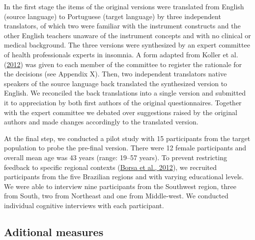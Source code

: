 \documentclass[
  ,doc,11pt, twoside,floatsintext]{apa6}
\begin{document}
In the first stage the items of the original versions were translated from English (source language) to Portuguese (target language) by three independent translators, of which two were familiar with the instrument constructs and the other English teachers unaware of the instrument concepts and with no clinical or medical background. The three versions were synthesized by an expert committee of health professionals experts in insomnia. A form adapted from Koller et al. (\protect\hyperlink{ref-koller2012}{2012}) was given to each member of the committee to register the rationale for the decisions (see Appendix X). Then, two independent translators native speakers of the source language back translated the synthesized version to English. We reconciled the back translations into a single version and submitted it to appreciation by both first authors of the original questionnaires. Together with the expert committee we debated over suggestions raised by the original authors and made changes accordingly to the translated version.

At the final step, we conducted a pilot study with 15 participants from the target population to probe the pre-final version. There were 12 female participants and overall mean age was 43 years (range: 19--57 years). To prevent restricting feedback to specific regional contexts (\protect\hyperlink{ref-borsaAdaptacaoValidacaoInstrumentos2012}{Borsa et al., 2012}), we recruited participants from the five Brazilian regions and with varying educational levels. We were able to interview nine participants from the Southwest region, three from South, two from Northeast and one from Middle-west. We conducted individual cognitive interviews with each participant.

\hypertarget{aditional-measures}{%
\subsection{Aditional measures}\label{aditional-measures}}
\end{document}
